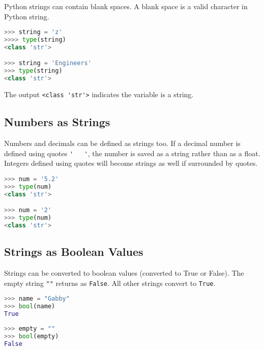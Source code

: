 \documentclass{book}
\newcommand{\passthrough}[1]{#1}
\begin{document}
Python strings can contain blank spaces. A blank space is a valid
character in Python string.

\begin{lstlisting}[language=Python]
>>> string = 'z'
>>>> type(string)
<class 'str'>

>>> string = 'Engineers'
>>> type(string)
<class 'str'>
\end{lstlisting}

The output \passthrough{\lstinline!<class 'str'>!} indicates the
variable is a string.
    




    
        \hypertarget{numbers-as-strings}{%
\subsection{Numbers as Strings}\label{numbers-as-strings}}

Numbers and decimals can be defined as strings too. If a decimal number
is defined using quotes \passthrough{\lstinline!'   '!}, the number is
saved as a string rather than as a float. Integers defined using quotes
will become strings as well if surrounded by quotes.

\begin{lstlisting}[language=Python]
>>> num = '5.2'
>>> type(num)
<class 'str'>

>>> num = '2'
>>> type(num)
<class 'str'>
\end{lstlisting}
    




    
        \hypertarget{strings-as-boolean-values}{%
\subsection{Strings as Boolean Values}\label{strings-as-boolean-values}}

Strings can be converted to boolean values (converted to True or False).
The empty string \passthrough{\lstinline!""!} returns as
\passthrough{\lstinline!False!}. All other strings convert to
\passthrough{\lstinline!True!}.

\begin{lstlisting}[language=Python]
>>> name = "Gabby"
>>> bool(name)
True
\end{lstlisting}

\begin{lstlisting}[language=Python]
>>> empty = ""
>>> bool(empty)
False
\end{lstlisting}
\end{document}
